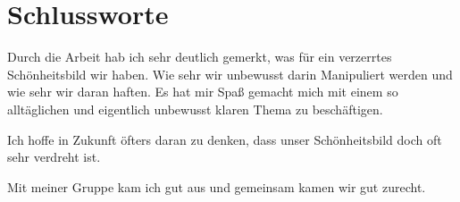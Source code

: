 \clearpage
\section{Schlussworte}
Durch die Arbeit hab ich sehr deutlich gemerkt, was für ein verzerrtes Schönheitsbild wir haben. Wie
sehr wir unbewusst darin Manipuliert werden und wie sehr wir daran haften.
Es hat mir Spaß gemacht mich mit einem so alltäglichen und eigentlich unbewusst klaren Thema zu
beschäftigen.

Ich hoffe in Zukunft öfters daran zu denken, dass unser Schönheitsbild doch oft sehr verdreht ist.

Mit meiner Gruppe kam ich gut aus und gemeinsam kamen wir gut zurecht.

\nocite{
	koerperkultur:korper-und-mode-korperinszenierung,
	Mueller:im_kampf_mit_dem_eigenen_koerper,
	Spiegel:body-modification-lust-am-horror-koerper,
	Lotze:Bodymodification.org,
	Wikipedia:Lippenteller,
	Wikipedia:Padaung,
	sweetminds:schonheitsideale-im-wandel,
	Wikipedia:Attraktivitaetsforschung,
	Wikipedia:Attraktivitaet,
	Wikipedia:Schoenheitsideal,
	crossdress:schonheitsideale-im-wandel,
	rpi-ekhn:Schoenheitsideale,
	Moeller:Schoenheitsformel,
	beautycheck.de:Durchschnittsgesichter,
}

\clearpage
\printbibliography[heading=source,keyword=Hannah]
